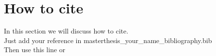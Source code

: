 \section{How to cite}
\label{introduction:how_to_cite}
In this section we will discuss how to cite.\\
Just add your reference in masterthesis\_your\_name\_bibliography.bib\\
Then use this line \cite{Abhau200501} or \cite{Disertori:2006}